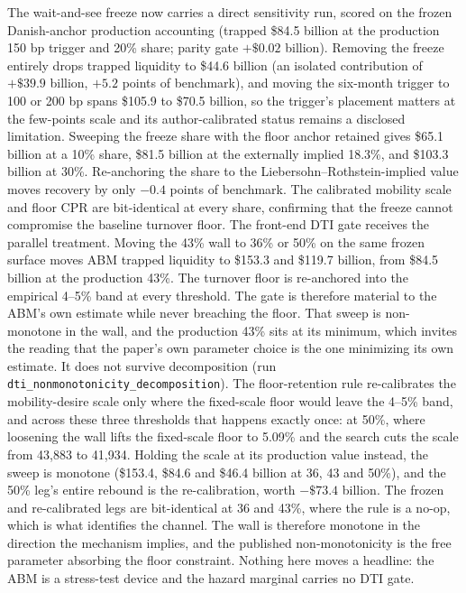\documentclass[12pt]{article}
\begin{document}
The wait-and-see freeze now carries a direct sensitivity run, scored on the frozen Danish-anchor production accounting (trapped \$84.5 billion at the production 150 bp trigger and 20\% share; parity gate $+\$0.02$ billion). Removing the freeze entirely drops trapped liquidity to \$44.6 billion (an isolated contribution of $+\$39.9$ billion, $+5.2$ points of benchmark), and moving the six-month trigger to 100 or 200 bp spans \$105.9 to \$70.5 billion, so the trigger's placement matters at the few-points scale and its author-calibrated status remains a disclosed limitation. Sweeping the freeze share with the floor anchor retained gives \$65.1 billion at a 10\% share, \$81.5 billion at the externally implied 18.3\%, and \$103.3 billion at 30\%. Re-anchoring the share to the Liebersohn--Rothstein-implied value moves recovery by only $-0.4$ points of benchmark. The calibrated mobility scale and floor CPR are bit-identical at every share, confirming that the freeze cannot compromise the baseline turnover floor. The front-end DTI gate receives the parallel treatment. Moving the 43\% wall to 36\% or 50\% on the same frozen surface moves ABM trapped liquidity to \$153.3 and \$119.7 billion, from \$84.5 billion at the production 43\%. The turnover floor is re-anchored into the empirical 4--5\% band at every threshold. The gate is therefore material to the ABM's own estimate while never breaching the floor. That sweep is non-monotone in the wall, and the production 43\% sits at its minimum, which invites the reading that the paper's own parameter choice is the one minimizing its own estimate. It does not survive decomposition (run \texttt{dti\_nonmonotonicity\_decomposition}). The floor-retention rule re-calibrates the mobility-desire scale only where the fixed-scale floor would leave the 4--5\% band, and across these three thresholds that happens exactly once: at 50\%, where loosening the wall lifts the fixed-scale floor to 5.09\% and the search cuts the scale from 43{,}883 to 41{,}934. Holding the scale at its production value instead, the sweep is monotone (\$153.4, \$84.6 and \$46.4 billion at 36, 43 and 50\%), and the 50\% leg's entire rebound is the re-calibration, worth $-\$73.4$ billion. The frozen and re-calibrated legs are bit-identical at 36 and 43\%, where the rule is a no-op, which is what identifies the channel. The wall is therefore monotone in the direction the mechanism implies, and the published non-monotonicity is the free parameter absorbing the floor constraint. Nothing here moves a headline: the ABM is a stress-test device and the hazard marginal carries no DTI gate.
\end{document}
